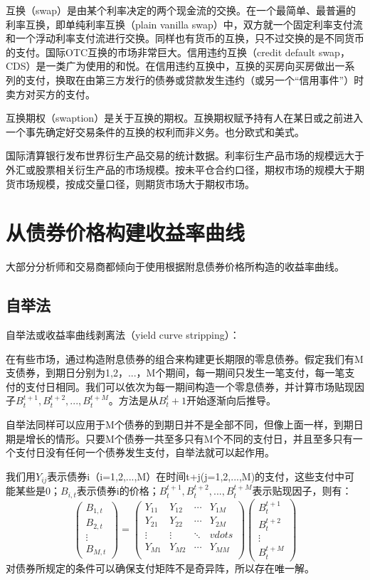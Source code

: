\documentclass[UTF8]{ctexart}
\newcommand \qd[1] {\begin{qds} {#1} \end{qds}}
\begin{document}
互换（swap）是由某个利率决定的两个现金流的交换。在一个最简单、最普遍的利率互换，即单纯利率互换（plain vanilla swap）中，双方就一个固定利率支付流和一个浮动利率支付流进行交换。同样也有货币的互换，只不过交换的是不同货币的支付。国际OTC互换的市场非常巨大。信用违约互换（credit default swap，CDS）是一类广为使用的和悦。在信用违约互换中，互换的买房向买房做出一系列的支付，换取在由第三方发行的债券或贷款发生违约（或另一个“信用事件”）时卖方对买方的支付。

互换期权（swaption）是关于互换的期权。互换期权赋予持有人在某日或之前进入一个事先确定好交易条件的互换的权利而非义务。也分欧式和美式。

国际清算银行发布世界衍生产品交易的统计数据。利率衍生产品市场的规模远大于外汇或股票相关衍生产品的市场规模。按未平仓合约口径，期权市场的规模大于期货市场规模，按成交量口径，则期货市场大于期权市场。

\section{从债券价格构建收益率曲线}
大部分分析师和交易商都倾向于使用根据附息债券价格所构造的收益率曲线。

\subsection{自举法}
\qd{自举法或收益率曲线剥离法（yield curve stripping）：}在有些市场，通过构造附息债券的组合来构建更长期限的零息债券。假定我们有M支债券，到期日分别为1,2，...，M个期间，每一期间只发生一笔支付，每一笔支付的支付日相同。我们可以依次为每一期间构造一个零息债券，并计算市场贴现因子$B_t^{t+1},B_t^{t+2},...,B_t^{t+M}$。方法是从$B_t^t+1$开始逐渐向后推导。

自举法同样可以应用于M个债券的到期日并不是全部不同，但像上面一样，到期日期是增长的情形。只要M个债券一共至多只有M个不同的支付日，并且至多只有一个支付日没有任何一个债券发生支付，自举法就可以起作用。

我们用$Y_{ij}$表示债券i（i=1,2,...,M）在时间t+j(j=1,2,...,M)的支付，这些支付中可能某些是0；$B_{i,t}$表示债券i的价格；$B_t^{t+1},B_t^{t+2},...,B_t^{t+M}$表示贴现因子，则有：
$$
\left(
    \begin{array}{c}
    B_{1,t}\\
    B_{2,t}\\
    \vdots \\
    B_{M,t}
\end{array}
\right)
=
\left(
    \begin{array}{cccc}
    Y_{11}&Y_{12}&\cdots&Y_{1M}\\
    Y_{21}&Y_{22}&\cdots&Y_{2M}\\
    \vdots&\vdots&\ddots&vdots\\
    Y_{M1}&Y_{M2}&\cdots&Y_{MM}\\
    \end{array}
\right)
\left(
    \begin{array}{c}
    B_t^{t+1}\\
    B_t^{t+2}\\
    \vdots \\
    B_t^{t+M}
    \end{array}
\right)
$$
对债券所规定的条件可以确保支付矩阵不是奇异阵，所以存在唯一解。
\end{document}
